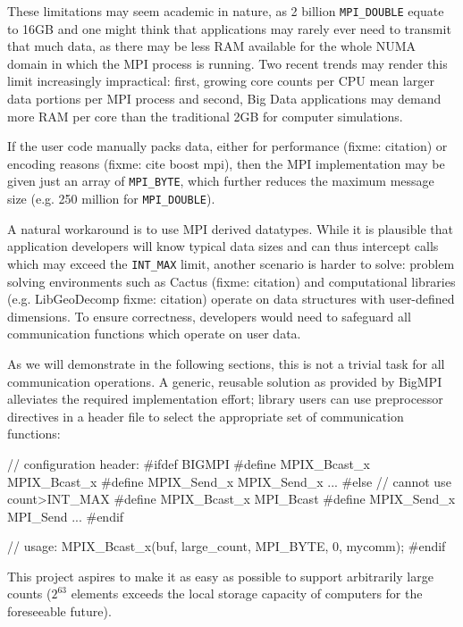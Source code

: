 These limitations may seem academic in nature, as 2 billion
\texttt{MPI\_DOUBLE} equate to 16GB and one might think that
applications may rarely ever need to transmit that much data, as there
may be less RAM available for the whole NUMA domain in which the MPI
process is running. Two recent trends may render this limit
increasingly impractical: first, growing core counts per CPU mean
larger data portions per MPI process and second, Big Data applications
may demand more RAM per core than the traditional 2GB for computer
simulations.

If the user code manually packs data, either for performance (fixme:
citation) or encoding reasons (fixme: cite boost mpi), then the MPI
implementation may be given just an array of \texttt{MPI\_BYTE}, which
further reduces the maximum message size (e.g. 250 million for
\texttt{MPI\_DOUBLE}).

A natural workaround is to use MPI derived datatypes. While it is
plausible that application developers will know typical data sizes and
can thus intercept calls which may exceed the \texttt{INT\_MAX} limit,
another scenario is harder to solve: problem solving environments such
as Cactus (fixme: citation) and computational libraries (e.g.
LibGeoDecomp fixme: citation) operate on data structures with
user-defined dimensions. To ensure correctness, developers would need
to safeguard all communication functions which operate on user data.

As we will demonstrate in the following sections, this is not a
trivial task for all communication operations. A generic, reusable
solution as provided by BigMPI alleviates the required implementation
effort; library users can use preprocessor directives in a header file
to select the appropriate set of communication functions:

\begin{code}
// configuration header:
#ifdef BIGMPI
#define MPIX_Bcast_x MPIX_Bcast_x
#define MPIX_Send_x MPIX_Send_x
...
#else // cannot use count>INT_MAX
#define MPIX_Bcast_x MPI_Bcast
#define MPIX_Send_x MPI_Send
...
#endif

// usage:
    MPIX_Bcast_x(buf, large_count, MPI_BYTE, 0, mycomm);
#endif
\end{code}

This project aspires to make it as easy as possible to support arbitrarily
large counts ($2^{63}$ elements exceeds the local storage capacity of computers
for the foreseeable future).


